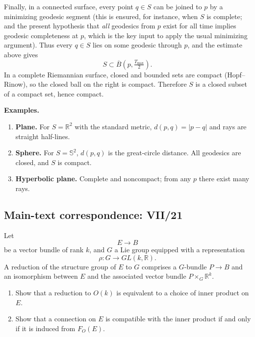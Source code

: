 \begin{solution}
	Finally, in a connected surface, every point $q\in S$ can be joined to $p$ by a minimizing geodesic segment (this is ensured, for instance,
	when $S$ is complete; and the present hypothesis that \emph{all} geodesics from $p$ exist for all time implies geodesic completeness at $p$,
	which is the key input to apply the usual minimizing argument). Thus every $q\in S$ lies on some geodesic through $p$, and the estimate above gives
	\[
	S \subset \overline B\!\left(p,\tfrac{T_{\max}}{2}\right).
	\]
	In a complete Riemannian surface, closed and bounded sets are compact (Hopf--Rinow), so the closed ball on the right is compact.
	Therefore $S$ is a closed subset of a compact set, hence compact.
	
	\medskip
	\textbf{Examples.}
	\begin{enumerate}
		\item \textbf{Plane.} For $S=\mathbb R^2$ with the standard metric, $d(p,q)=|p-q|$ and rays are straight half-lines.
		\item \textbf{Sphere.} For $S=\mathbb S^2$, $d(p,q)$ is the great-circle distance. All geodesics are closed, and $S$ is compact.
		\item \textbf{Hyperbolic plane.} Complete and noncompact; from any $p$ there exist many rays.
	\end{enumerate}
\end{solution}

\subsection*{Main-text correspondence: VII/21}

\begin{problem}
\label{prob:cp-vii-0060}
Let
\[
E\longrightarrow B
\]
be a vector bundle of rank $k$, and $G$ a Lie group equipped with a representation
\[
\rho:G\longrightarrow GL(k,\mathbb{R}).
\]
A reduction of the structure group of $E$ to $G$ comprises a $G$-bundle $P\to B$ and an isomorphism between $E$ and the associated vector bundle $P\times_G\mathbb{R}^k$.

\begin{enumerate}[label=\textnormal{(\alph*)}]
\item Show that a reduction to \(O(k)\) is equivalent to a choice of inner product on \(E\).
\item Show that a connection on \(E\) is compatible with the inner product if and only if
it is induced from \(F_O(E)\).
\end{enumerate}
\end{problem}

